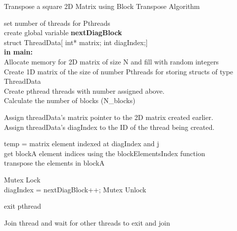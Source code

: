 \documentclass[10pt, onecolumn]{article}
\begin{document}
\begin{algorithm}[H]
   \label{Alg:PThreadBlockAlgorithm2}
    \caption{Transpose a square 2D Matrix using Block Transpose Algorithm}
    set number of threads for Pthreads\\
    create global variable \textbf{nextDiagBlock} \\
    struct ThreadData[ int* matrix; int diagIndex;] \\
    
    \textbf{in main:} \\
    Allocate memory for 2D matrix of size N and fill with random integers \\
    Create 1D matrix of the size of number Pthreads for storing structs of type ThreadData \\
    Create pthread threads with number assigned above.\\
    Calculate the number of blocks (N\_blocks)\\
    {   
        Assign threadData's matrix pointer to the 2D matrix created earlier.\\
        Assign threadData's diagIndex to the ID of the thread being created.\\
        {
            {
                temp = matrix element indexed at diagIndex and j \\
                get blockA element indices using the blockElementsIndex function\\
                transpose the elements in blockA\\
            }
            
            Mutex Lock\\
             {diagIndex = nextDiagBlock++;}
            Mutex Unlock\\
            
        }
        exit pthread
    }
    
    {
        Join thread and wait for other threads to exit and join
    }
\end{algorithm}
%
\end{document}
